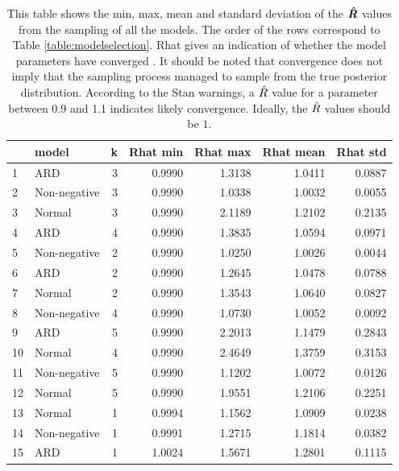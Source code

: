 \documentclass[12pt]{article}
\begin{document}
    \begin{table}[H]
        \centering
        \caption{This table shows the min, max, mean and standard deviation of the $\boldsymbol{\hat{R}}$ values from the sampling of all the models. The order of the rows correspond to Table \ref{table:modelselection}. Rhat gives an indication of whether the model parameters have converged \cite{Rhat}. It should be noted that convergence does not imply that the sampling process managed to sample from the true posterior distribution. According to the Stan warnings, a $\hat{R}$ value for a parameter between 0.9 and 1.1 indicates likely convergence. Ideally, the $\hat{R}$ values should be $1$.}
        \label{table:rhats}
        \begin{tabular}{llr|rr|rr}
            \toprule
            {} &         model &  k &  Rhat min &  Rhat max &  Rhat mean &  Rhat std \\
            \midrule
            1  &           ARD &  3 &    0.9990 &    1.3138 &     1.0411 &    0.0887 \\
            2  &  Non-negative &  3 &    0.9990 &    1.0338 &     1.0032 &    0.0055 \\
            3  &        Normal &  3 &    0.9990 &    2.1189 &     1.2102 &    0.2135 \\
            4  &           ARD &  4 &    0.9990 &    1.3835 &     1.0594 &    0.0971 \\
            5  &  Non-negative &  2 &    0.9990 &    1.0250 &     1.0026 &    0.0044 \\
            6  &           ARD &  2 &    0.9990 &    1.2645 &     1.0478 &    0.0788 \\
            7  &        Normal &  2 &    0.9990 &    1.3543 &     1.0640 &    0.0827 \\
            8  &  Non-negative &  4 &    0.9990 &    1.0730 &     1.0052 &    0.0092 \\
            9  &           ARD &  5 &    0.9990 &    2.2013 &     1.1479 &    0.2843 \\
            10 &        Normal &  4 &    0.9990 &    2.4649 &     1.3759 &    0.3153 \\
            11 &  Non-negative &  5 &    0.9990 &    1.1202 &     1.0072 &    0.0126 \\
            12 &        Normal &  5 &    0.9990 &    1.9551 &     1.2106 &    0.2251 \\
            13 &        Normal &  1 &    0.9994 &    1.1562 &     1.0909 &    0.0238 \\
            14 &  Non-negative &  1 &    0.9991 &    1.2715 &     1.1814 &    0.0382 \\
            15 &           ARD &  1 &    1.0024 &    1.5671 &     1.2801 &    0.1115 \\
            \bottomrule
        \end{tabular}
    \end{table}
\end{document}
